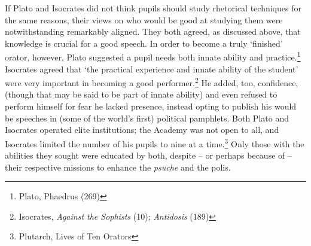 \begin{multicols}{2}
If Plato and Isocrates did not think pupils should study rhetorical
techniques for the same reasons, their views on who would be good at
studying them were notwithstanding remarkably aligned. They both agreed,
as discussed above, that knowledge is crucial for a good speech. In
order to become a truly `finished' orator, however, Plato suggested a
pupil needs both innate ability and practice.\footnote{\textsuperscript{}
	Plato, Phaedrus (269)} Isocrates agreed that `the practical experience
and innate ability of the student' were very important in becoming a
good performer.\footnote{\textsuperscript{} Isocrates, \emph{Against the
		Sophists} (10); \emph{Antidosis} (189)} He added, too, confidence,
(though that may be said to be part of innate ability) and even refused
to perform himself for fear he lacked presence, instead opting to
publish his would be speeches in (some of the world's first) political
pamphlets. Both Plato and Isocrates operated elite institutions; the
Academy was not open to all, and Isocrates limited the number of his
pupils to nine at a time.\footnote{\textsuperscript{} Plutarch, Lives of
	Ten Orators} Only those with the abilities they sought were educated
by both, despite -- or perhaps because of -- their respective missions
to enhance the \emph{psuche} and the polis.


\end{multicols}
